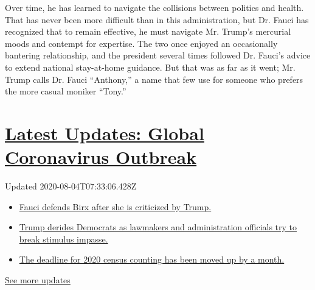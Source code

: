 Over time, he has learned to navigate the collisions between politics
and health. That has never been more difficult than in this
administration, but Dr. Fauci has recognized that to remain effective,
he must navigate Mr. Trump's mercurial moods and contempt for expertise.
The two once enjoyed an occasionally bantering relationship, and the
president several times followed Dr. Fauci's advice to extend national
stay-at-home guidance. But that was as far as it went; Mr. Trump calls
Dr. Fauci ``Anthony,'' a name that few use for someone who prefers the
more casual moniker ``Tony.''

\hypertarget{latest-updates-global-coronavirus-outbreak}{%
\section{\texorpdfstring{\href{https://www.nytimes.com/2020/08/03/world/coronavirus-covid-19.html?action=click\&pgtype=Article\&state=default\&region=MAIN_CONTENT_1\&context=storylines_live_updates}{Latest
Updates: Global Coronavirus
Outbreak}}{Latest Updates: Global Coronavirus Outbreak}}\label{latest-updates-global-coronavirus-outbreak}}

Updated 2020-08-04T07:33:06.428Z

\begin{itemize}
\tightlist
\item
  \href{https://www.nytimes.com/2020/08/03/world/coronavirus-covid-19.html?action=click\&pgtype=Article\&state=default\&region=MAIN_CONTENT_1\&context=storylines_live_updates\#link-4547638f}{Fauci
  defends Birx after she is criticized by Trump.}
\item
  \href{https://www.nytimes.com/2020/08/03/world/coronavirus-covid-19.html?action=click\&pgtype=Article\&state=default\&region=MAIN_CONTENT_1\&context=storylines_live_updates\#link-15e7f995}{Trump
  derides Democrats as lawmakers and administration officials try to
  break stimulus impasse.}
\item
  \href{https://www.nytimes.com/2020/08/03/world/coronavirus-covid-19.html?action=click\&pgtype=Article\&state=default\&region=MAIN_CONTENT_1\&context=storylines_live_updates\#link-e5a2cda}{The
  deadline for 2020 census counting has been moved up by a month.}
\end{itemize}

\href{https://www.nytimes.com/2020/08/03/world/coronavirus-covid-19.html?action=click\&pgtype=Article\&state=default\&region=MAIN_CONTENT_1\&context=storylines_live_updates}{See
more updates}

